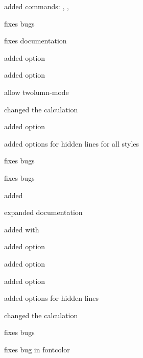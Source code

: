 \documentclass[parskip=false,english,11pt]{ltxmdf}
\begin{document}
\begin{itemize*}
\item  added commands: , , 
\item fixes bugs
\item fixes documentation
\end{itemize*}

\begin{itemize*}
\item added option 
\item added option 
\item allow twolumn-mode
\item changed the calculation
\item added option 
\item added options for hidden lines for all styles
\item fixes bugs
\end{itemize*}

\begin{itemize*}
\item fixes bugs
\item added 
\item expanded documentation
\end{itemize*}



\begin{itemize*}
\item added  with 
\item added option 
\item added option 
\item added option 
\item added options for hidden lines 
\item changed the calculation
\item fixes bugs
\end{itemize*}

\begin{itemize*}
\item fixes bug in fontcolor
\end{itemize*}
\end{document}
